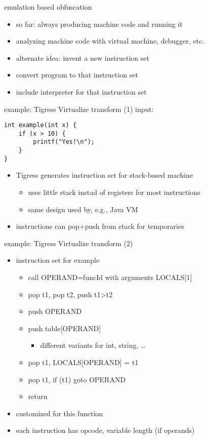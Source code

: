 \begin{frame}{emulation based obfuscation}
    \begin{itemize}
    \item so far: always producing machine code and running it
    \item analyzing machine code with virtual machine, debugger, etc.
    \vspace{.5cm}
    \item alternate idea: invent a new instruction set
    \item convert program to that instruction set
    \item include interpreter for that instruction set
    \end{itemize}
\end{frame}

\begin{frame}[fragile,label=VirtIntro]{example: Tigress Virtualize transform (1)}
input:
\begin{lstlisting}[style=smaller]
int example(int x) {
    if (x > 10) {
        printf("Yes!\n");
    }   
}
\end{lstlisting}
\begin{itemize}
\item Tigress generates instruction set for stack-based machine
    \begin{itemize}
    \item uses little stack instad of registers for most instructions
    \item same design used by, e.g., Java VM
    \end{itemize}
\item instructions can pop+push from stack for temporaries
\end{itemize}
\end{frame}

\begin{frame}[fragile,label=VirtISA]{example: Tigress Virtualize transform (2)}
\begin{itemize}
\item instruction set for example
\begin{itemize}
\item call OPERAND=funcId with arguments LOCALS[1]
\item pop t1, pop t2, push t1>t2
\item push OPERAND
\item push table[OPERAND]
    \begin{itemize}
    \item different variants for int, string, \ldots
    \end{itemize}
\item pop t1, LOCALS[OPERAND] = t1
\item pop t1, if (t1) goto OPERAND
\item return
\end{itemize}
\item customized for this function
\item each instruction has opcode, variable length (if operands)
\end{itemize}
\end{frame}

